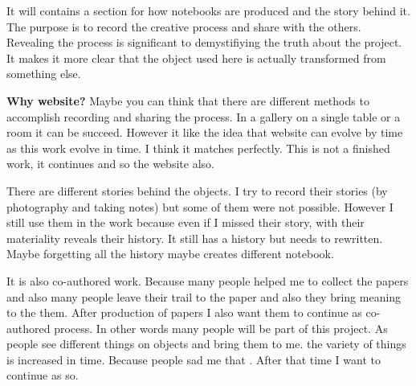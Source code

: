 It will contains a section for how notebooks are produced and the story behind it. The purpose is to record the creative process and share with the others. Revealing the process is significant to demystifiying the truth about the project. It makes it more clear that the object used here is actually transformed from something else. 

\textbf{Why website?} Maybe you can think that there are different methods to accomplish recording and sharing the process. In a gallery on a single table or a room it can be succeed. However it like the idea that website can evolve by time as this work evolve in time. I think it matches perfectly. This is not a finished work, it continues and so the website also. 

There are different stories behind the objects. I try to record their stories (by photography and taking notes) but some of them were not possible. However I still use them in the work because even if I missed their story, with their materiality reveals their history. It still has a history but needs to rewritten. Maybe forgetting all the history maybe creates different notebook.

It is also co-authored work. Because many people helped me to collect the papers and also many people leave their trail to the paper and also they bring meaning to the them. After production of papers I also want them to continue as co-authored process. In other words many people will be part of this project. As people see different things on objects and bring them to me. the variety of things is increased in time. Because people sad me that . After that time I want to continue as so. 





